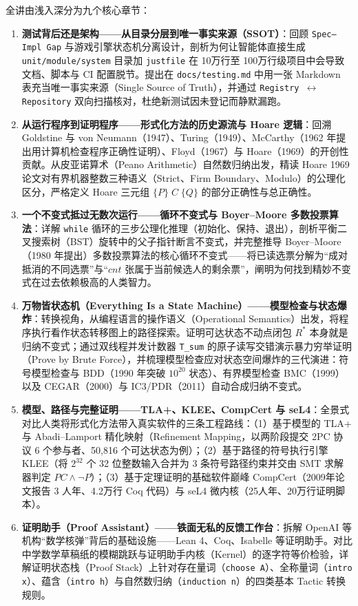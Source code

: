 \documentclass[a4paper]{article}
\begin{document}
全讲由浅入深分为九个核心章节：
\begin{enumerate}
    \item \textbf{测试背后还是架构——从目录分层到唯一事实来源（SSOT）}：回顾 \texttt{Spec--Impl Gap} 与游戏引擎状态机分离设计，剖析为何让智能体直接生成 \texttt{unit/module/system} 目录加 \texttt{justfile} 在 10万行至 100万行级项目中会导致文档、脚本与 CI 配置脱节。提出在 \texttt{docs/testing.md} 中用一张 Markdown 表充当唯一事实来源（Single Source of Truth），并通过 \texttt{Registry $\leftrightarrow$ Repository} 双向扫描核对，杜绝新测试因未登记而静默漏跑。
    \item \textbf{从运行程序到证明程序——形式化方法的历史源流与 Hoare 逻辑}：回溯 Goldstine 与 von Neumann（1947）、Turing（1949）、McCarthy（1962 年提出用计算机检查程序正确性证明）、Floyd（1967）与 Hoare（1969）的开创性贡献。从皮亚诺算术（Peano Arithmetic）自然数归纳出发，精读 Hoare 1969 论文对有界机器整数三种语义（Strict、Firm Boundary、Modulo）的公理化区分，严格定义 Hoare 三元组 $\{P\}\; C\; \{Q\}$ 的部分正确性与总正确性。
    \item \textbf{一个不变式抵过无数次运行——循环不变式与 Boyer--Moore 多数投票算法}：详解 \texttt{while} 循环的三步公理化推理（初始化、保持、退出），剖析平衡二叉搜索树（BST）旋转中的父子指针断言不变式，并完整推导 Boyer--Moore（1980 年提出）多数投票算法的核心循环不变式——将已读选票分解为“成对抵消的不同选票”与“$\mathit{cnt}$ 张属于当前候选人的剩余票”，阐明为何找到精妙不变式在过去依赖极高的人类智力。
    \item \textbf{万物皆状态机（Everything Is a State Machine）——模型检查与状态爆炸}：转换视角，从编程语言的操作语义（Operational Semantics）出发，将程序执行看作状态转移图上的路径探索。证明可达状态不动点闭包 $R^*$ 本身就是归纳不变式；通过双线程并发计数器 \texttt{T\_sum} 的原子读写交错演示暴力穷举证明（Prove by Brute Force），并梳理模型检查应对状态空间爆炸的三代演进：符号模型检查与 BDD（1990 年突破 $10^{20}$ 状态）、有界模型检查 BMC（1999）以及 CEGAR（2000）与 IC3/PDR（2011）自动合成归纳不变式。
    \item \textbf{模型、路径与完整证明——TLA+、KLEE、CompCert 与 seL4}：全景式对比人类将形式化方法带入真实软件的三条工程路线：（1）基于模型的 TLA+ 与 Abadi--Lamport 精化映射（Refinement Mapping，以两阶段提交 2PC 协议 6 个参与者、50,816 个可达状态为例）；（2）基于路径的符号执行引擎 KLEE（将 $2^{32}$ 个 32 位整数输入合并为 3 条符号路径约束并交由 SMT 求解器判定 $\mathit{PC} \land \neg P$）；（3）基于定理证明的基础软件巅峰 CompCert（2009年论文报告 3 人年、4.2万行 Coq 代码）与 seL4 微内核（25人年、20万行证明脚本）。
    \item \textbf{证明助手（Proof Assistant）——铁面无私的反馈工作台}：拆解 OpenAI 等机构“数学核弹”背后的基础设施——Lean 4、Coq、Isabelle 等证明助手。对比中学数学草稿纸的模糊跳跃与证明助手内核（Kernel）的逐字符等价检验，详解证明状态栈（Proof Stack）上针对存在量词（\texttt{choose A}）、全称量词（\texttt{intro x}）、蕴含（\texttt{intro h}）与自然数归纳（\texttt{induction n}）的四类基本 Tactic 转换规则。

\end{enumerate}
\end{document}
